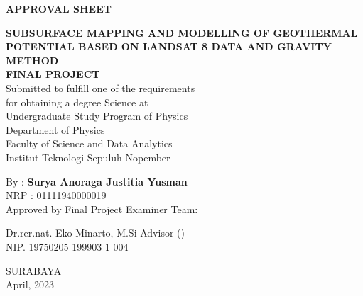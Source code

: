 \newpage
\begin{center}
	\textbf{APPROVAL SHEET}\\
	\vskip30pt
	
	\textbf{SUBSURFACE MAPPING AND MODELLING OF GEOTHERMAL POTENTIAL BASED ON LANDSAT 8 DATA AND GRAVITY METHOD}\\
	
	\vskip30pt
	\textbf{FINAL PROJECT}\\
	\doublespacing
	Submitted to fulfill one of the requirements\\
	for obtaining a degree Science at\\
	Undergraduate Study Program of Physics\\
	Department of Physics\\
	Faculty of Science and Data Analytics\\
	Institut Teknologi Sepuluh Nopember\\
	\vskip 20pt
	
	By : \textbf{Surya Anoraga Justitia Yusman}\\
	NRP : 01111940000019\\
	
	\vskip 50pt
	Approved by Final Project Examiner Team:
\end{center}
		\vskip 35pt
		Dr.rer.nat. Eko Minarto, M.Si \hfill Advisor \hfill (\dotfill)\\
		NIP. 19750205 199903 1 004
\begin{center}
	\vfill
	SURABAYA\\
	April, 2023
\end{center}
\restoregeometry